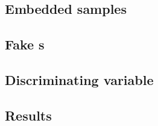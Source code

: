 \subsection*{Embedded samples}


\subsection*{Fake \tauh s}


\subsection*{Discriminating variable}


\subsection*{Results}

